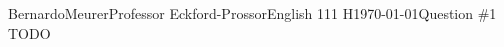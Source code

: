 \documentclass[12pt,letterpaper]{article}
\begin{document}
\begin{mla}{Bernardo}{Meurer}{Professor Eckford-Prossor}{English 111 H}{\today}{Question \#1}
    TODO
\end{mla}
\end{document}
